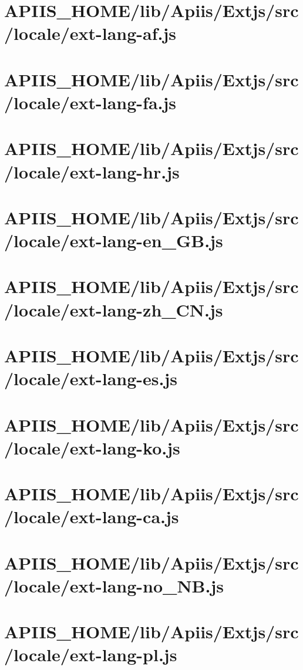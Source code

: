 \section{APIIS\_HOME/lib/Apiis/Extjs/src/locale/ext-lang-af.js} 
\section{APIIS\_HOME/lib/Apiis/Extjs/src/locale/ext-lang-fa.js} 
\section{APIIS\_HOME/lib/Apiis/Extjs/src/locale/ext-lang-hr.js} 
\section{APIIS\_HOME/lib/Apiis/Extjs/src/locale/ext-lang-en\_GB.js} 
\section{APIIS\_HOME/lib/Apiis/Extjs/src/locale/ext-lang-zh\_CN.js} 
\section{APIIS\_HOME/lib/Apiis/Extjs/src/locale/ext-lang-es.js} 
\section{APIIS\_HOME/lib/Apiis/Extjs/src/locale/ext-lang-ko.js} 
\section{APIIS\_HOME/lib/Apiis/Extjs/src/locale/ext-lang-ca.js} 
\section{APIIS\_HOME/lib/Apiis/Extjs/src/locale/ext-lang-no\_NB.js} 
\section{APIIS\_HOME/lib/Apiis/Extjs/src/locale/ext-lang-pl.js} 
